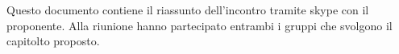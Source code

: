 Questo documento contiene il riassunto dell'incontro tramite skype con il proponente. Alla riunione hanno partecipato entrambi i gruppi che svolgono il capitolto proposto.

